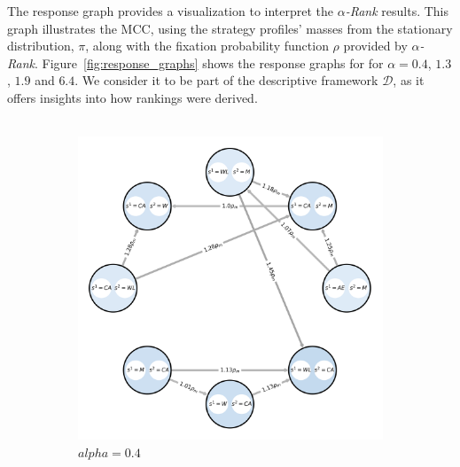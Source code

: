 \begin{flushleft}
\begin{flushleft}
        The response graph provides a visualization to interpret the \emph{$\alpha$-Rank} results. This graph illustrates the MCC, using the strategy profiles' masses from the stationary distribution, $\pi$, along with the fixation probability function $\rho$ provided by \emph{$\alpha$-Rank}. Figure~\ref{fig:response_graphs} shows the response graphs for for $\alpha = 0.4$, $1.3$, $1.9$ and $6.4$. We consider it to be part of the descriptive framework $\mathcal{D}$, as it offers insights into how rankings were derived.\\~\\
        \begin{figure}[H]
            \centering
            \begin{subfigure}[b]{0.39\linewidth}
                \includegraphics[width=\linewidth]{images/rg_0.4.png}
                \caption{$alpha=0.4$}
                \label{fig:response_graph_0.4}
            \end{subfigure}
            \hfill
            \begin{subfigure}[b]{0.39\linewidth}

\end{subfigure}
\end{figure}
\end{flushleft}
\end{flushleft}
